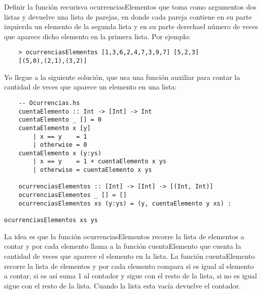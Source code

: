 Definir la función recurisva ocurrenciasElementos que toma
como argumentos dos listas y devuelve una lista de parejas, 
en donde cada pareja contiene en su parte izquierda un elemento 
de la segunda lista y en su parte derechael número de veces que 
aparece dicho elemento en la primera lista. Por ejemplo:

\begin{verbatim}
    > ocurrenciasElementos [1,3,6,2,4,7,3,9,7] [5,2,3]
    [(5,0),(2,1),(3,2)]
\end{verbatim}

Yo llegue a la siguiente solución, que usa una función auxiliar
para contar la cantidad de veces que aparece un elemento en una
lista:
\begin{verbatim}
    -- Ocurrencias.hs
    cuentaElemento :: Int -> [Int] -> Int
    cuentaElemento _ [] = 0
    cuentaElemento x [y]
        | x == y    = 1
        | otherwise = 0
    cuentaElemento x (y:ys)
        | x == y    = 1 + cuentaElemento x ys
        | otherwise = cuentaElemento x ys

    ocurrenciasElementos :: [Int] -> [Int] -> [(Int, Int)]
    ocurrenciasElementos _ [] = []
    ocurrenciasElementos xs (y:ys) = (y, cuentaElemento y xs) : 
                                                    ocurrenciasElementos xs ys
\end{verbatim}

La idea es que la función ocurrenciasElementos recorre la lista
de elementos a contar y por cada elemento llama a la función
cuentaElemento que cuenta la cantidad de veces que aparece el
elemento en la lista. La función cuentaElemento recorre la lista
de elementos y por cada elemento compara si es igual al elemento
a contar, si es así suma 1 al contador y sigue con el resto de la
lista, si no es igual sigue con el resto de la lista. Cuando la
lista esta vacía devuelve el contador.